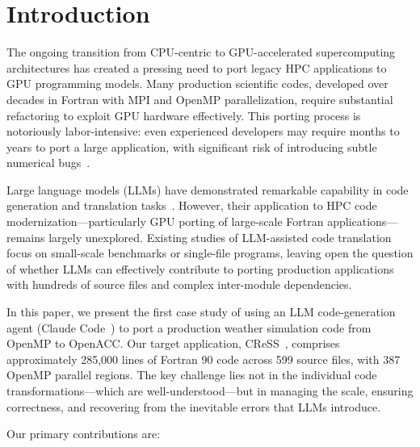 \documentclass[conference]{IEEEtran}
\begin{document}
\section{Introduction}
\label{sec:intro}

The ongoing transition from CPU-centric to GPU-accelerated supercomputing
architectures has created a pressing need to port legacy HPC applications to
GPU programming models. Many production scientific codes, developed over
decades in Fortran with MPI and OpenMP parallelization, require substantial
refactoring to exploit GPU hardware effectively. This porting process is
notoriously labor-intensive: even experienced developers may require months to
years to port a large application, with significant risk of introducing subtle
numerical bugs~\cite{ref:gpu_porting_challenges}.

Large language models (LLMs) have demonstrated remarkable capability in code
generation and translation tasks~\cite{ref:codex, ref:copilot}. However,
their application to HPC code modernization---particularly GPU porting of
large-scale Fortran applications---remains largely unexplored. Existing
studies of LLM-assisted code translation focus on small-scale benchmarks or
single-file programs, leaving open the question of whether LLMs can
effectively contribute to porting production applications with hundreds of
source files and complex inter-module dependencies.

In this paper, we present the first case study of using an LLM code-generation
agent (Claude Code~\cite{ref:claude}) to port a production weather simulation
code from OpenMP to OpenACC. Our target application, CReSS~\cite{ref:cress},
comprises approximately 285,000 lines of Fortran 90 code across 599 source
files, with 387 OpenMP parallel regions. The key challenge lies not in the
individual code transformations---which are well-understood---but in managing
the scale, ensuring correctness, and recovering from the inevitable errors
that LLMs introduce.

Our primary contributions are:
\end{document}
